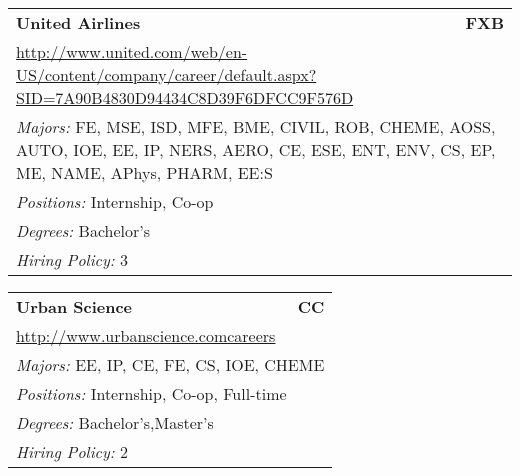 \documentclass[twoside]{article}
\begin{document}
\begin{center}
\begin{multicols}{3}
\begin{FlushLeft}
\begin{minipage}{.9\columnwidth}\begin{tabularx}{.95\columnwidth}{Xr}
                 {\Large\bf United Airlines} & {\Large\bf FXB}\\
    \multicolumn{2}{p{.95\columnwidth}}{\url{http://www.united.com/web/en-US/content/company/career/default.aspx?SID=7A90B4830D94434C8D39F6DFCC9F576D}}\\
    \multicolumn{2}{p{.95\columnwidth}}{\emph{Majors:} FE, MSE, ISD, MFE, BME, CIVIL, ROB, CHEME, AOSS, AUTO, IOE, EE, IP, NERS, AERO, CE, ESE, ENT, ENV, CS, EP, ME, NAME, APhys, PHARM, EE:S}\\
    \multicolumn{2}{p{.95\columnwidth}}{\emph{Positions:} Internship, Co-op}\\
    \multicolumn{2}{p{.95\columnwidth}}{\emph{Degrees:} Bachelor's}\\
    \multicolumn{2}{p{.95\columnwidth}}{\emph{Hiring Policy:} 3}\\
    \end{tabularx}
    
\end{minipage}
 
\begin{minipage}{.9\columnwidth}\begin{tabularx}{.95\columnwidth}{Xr}
                 {\Large\bf Urban Science} & {\Large\bf CC}\\
    \multicolumn{2}{p{.95\columnwidth}}{\url{http://www.urbanscience.comcareers}}\\
    \multicolumn{2}{p{.95\columnwidth}}{\emph{Majors:} EE, IP, CE, FE, CS, IOE, CHEME}\\
    \multicolumn{2}{p{.95\columnwidth}}{\emph{Positions:} Internship, Co-op, Full-time}\\
    \multicolumn{2}{p{.95\columnwidth}}{\emph{Degrees:} Bachelor's,Master's}\\
    \multicolumn{2}{p{.95\columnwidth}}{\emph{Hiring Policy:} 2}\\
    \end{tabularx}
    
\end{minipage}
 

\end{FlushLeft}
\end{multicols}
\end{center}
\end{document}

